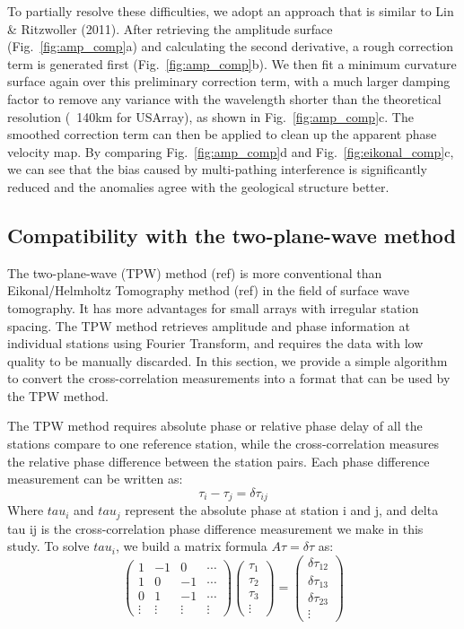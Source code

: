 \documentclass[referee]{gji}
\begin{document}
{{To partially resolve these difficulties, we adopt an approach that is similar to Lin \& Ritzwoller (2011). After retrieving the amplitude surface (Fig.~\ref{fig:amp_comp}a) and calculating the second derivative, a rough correction term is generated first (Fig.~\ref{fig:amp_comp}b). We then fit a minimum curvature surface again over this preliminary correction term, with a much larger damping factor to remove any variance with the wavelength shorter than the theoretical resolution (~140km for USArray), as shown in Fig.~\ref{fig:amp_comp}c. The smoothed correction term can then be applied to clean up the apparent phase velocity map. By comparing Fig.~\ref{fig:amp_comp}d and Fig.~\ref{fig:eikonal_comp}c, we can see that the bias caused by multi-pathing interference is significantly reduced and the anomalies agree with the geological structure better. 

\subsection{Compatibility with the two-plane-wave method}
The two-plane-wave (TPW) method (ref) is more conventional than Eikonal/Helmholtz Tomography method (ref) in the field of surface wave tomography. It has more advantages for small arrays with irregular station spacing.  The TPW method retrieves amplitude and phase information at individual stations using Fourier Transform, and requires the data with low quality to be manually discarded.  In this section, we provide a simple algorithm to convert the cross-correlation measurements into a format that can be used by the TPW method.

The TPW method requires absolute phase or relative phase delay of all the stations compare to one reference station, while the cross-correlation measures the relative phase difference between the station pairs. Each phase difference measurement can be written as:
\[
\tau_i - \tau_j = \delta \tau_{ij}
\]
Where $tau_i$ and $tau_j$ represent the absolute phase at station i and j, and delta tau ij is the cross-correlation phase difference measurement we make in this study. To solve $tau_i$, we build a matrix formula $A\tau = \delta\tau$ as:
\[ 
\left( \begin{array}{cccc}
1 & -1 & 0 & \cdots \\
1 & 0 & -1 & \cdots \\
0 & 1 & -1 & \cdots \\
\vdots &\vdots &\vdots & \vdots
\end{array} \right)
\left( \begin{array}{c}
	\tau_1 \\ 
	\tau_2 \\
	\tau_3 \\
	\vdots
\end{array} \right) = 
\left( \begin{array}{c}
	\delta \tau_{12} \\ 
	\delta \tau_{13} \\
	\delta \tau_{23} \\
	\vdots
\end{array} \right)  
\] 

}}
\end{document}
